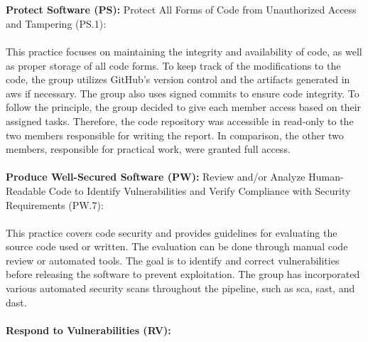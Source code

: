 \\~\\        
\textbf{Protect Software (PS):}
Protect All Forms of Code from Unauthorized
Access and Tampering (PS.1): \textit{}\cite{ssdf}
\\~\\
This practice focuses on maintaining the integrity and availability of code, as well as proper storage of all code forms. To keep track of the modifications to the code, the group utilizes GitHub's version control and the artifacts generated in \acrshort{aws} if necessary. The group also uses signed commits to ensure code integrity. To follow the  principle, the group decided to give each member access based on their assigned tasks. Therefore, the code repository was accessible in read-only to the two members responsible for writing the report. In comparison, the other two members, responsible for practical work, were granted full access. 
\\~\\
\textbf{Produce Well-Secured Software (PW):} Review and/or Analyze Human-Readable
Code to Identify Vulnerabilities and Verify Compliance with Security Requirements (PW.7): \textit{}\cite{ssdf}
\\~\\
This practice covers code security and provides guidelines for evaluating the source code used or written. The evaluation can be done through manual code review or automated tools. The goal is to identify and correct vulnerabilities before releasing the software to prevent exploitation. The group has incorporated various automated security scans throughout the pipeline, such as \acrshort{sca}, \acrshort{sast}, and \acrshort{dast}. 
\\~\\
\textbf{Respond to Vulnerabilities (RV):}
